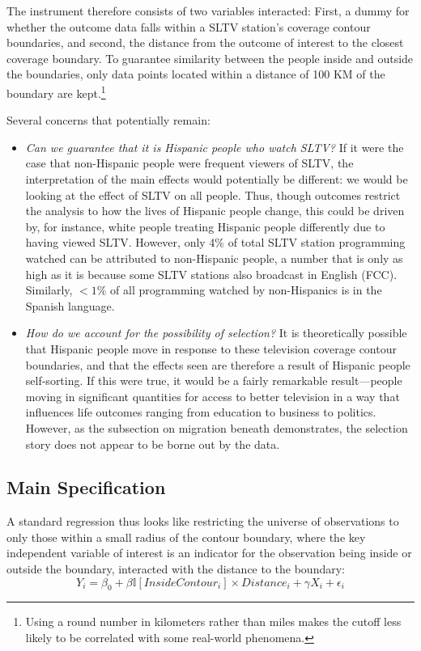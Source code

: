 \documentclass[11pt]{article}
\begin{document}
The instrument therefore consists of two variables interacted: First, a dummy for whether the outcome data falls within a SLTV station's coverage contour boundaries, and second, the distance from the outcome of interest to the closest coverage boundary. To guarantee similarity between the people inside and outside the boundaries, only data points located within a distance of 100 KM of the boundary are kept.\footnote{ Using a round number in kilometers rather than miles makes the cutoff less likely to be correlated with some real-world phenomena.} 

Several concerns that potentially remain:
\begin{itemize}
\item \textit{Can we guarantee that it is Hispanic people who watch SLTV?} If it were the case that non-Hispanic people were frequent viewers of SLTV, the interpretation of the main effects would potentially be different: we would be looking at the effect of SLTV on all people. Thus, though outcomes restrict the analysis to how the lives of Hispanic people change, this could be driven by, for instance, white people treating Hispanic people differently due to having viewed SLTV. However, only 4\% of total SLTV station programming watched can be attributed to non-Hispanic people, a number that is only as high as it is because some SLTV stations also broadcast in English  (FCC\cite{noauthor_hispanic_2016}). Similarly, $<1\%$ of all programming watched by non-Hispanics is in the Spanish language.

\item \textit{How do we account for the possibility of selection?} It is theoretically possible that Hispanic people move in response to these television coverage contour boundaries, and that the effects seen are therefore a result of Hispanic people self-sorting. If this were true, it would be a fairly remarkable result---people moving in significant quantities for access to better television in a way that influences life outcomes ranging from education to business to politics. However, as the subsection on migration beneath demonstrates, the selection story does not appear to be borne out by the data.
\end{itemize}

\subsection{Main Specification}

A standard regression thus looks like restricting the universe of observations to only those within a small radius of the contour boundary, where the key independent variable of interest is an indicator for the observation being inside or outside the boundary, interacted with the distance to the boundary:
\[ Y_i^{} = \beta_0 + \beta \mathbb{I}[InsideContour_i] \times Distance_i + \gamma X_i + \epsilon_i \]
\end{document}
